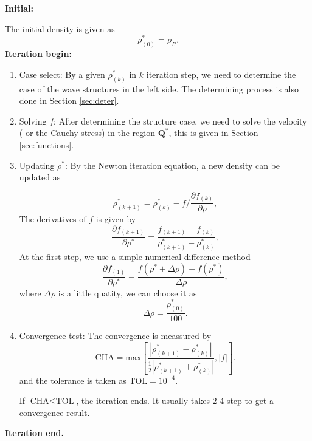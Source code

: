 \documentclass{article}
\numberwithin{equation}{section}
\numberwithin{table}{section}
\begin{document}
\noindent  \textbf{Initial:}

	The initial density is  given as
\begin{equation}
\rho_{(0)}^* = \rho_R.
\end{equation}
\textbf{Iteration begin:}
\begin{enumerate}[Step 1]
  \item Case select:
	By a given  $\rho _{(k)}^*$ in $k$ iteration step, we need to determine the case of the wave structures in the left side. The determining  process is  also done in Section \ref{sec:deter}.

  \item Solving $f$:  After determining the structure case, we need to solve the velocity ( or  the Cauchy stress) in  the region $\mathbf{Q}^*$, this is  given in Section \ref{sec:functions}.

  \item  Updating   $\rho^*$:   By the Newton iteration equation, a new density can be updated as

\begin{equation}
 \rho^*_{(k+1)} = \rho^*_{(k)}- f/\frac{\partial f_{(k)}}{\partial \rho},
\end{equation}
The derivatives of $f$ is  given by
\begin{equation}
  \frac{\partial f_{(k+1)}}{\partial \rho^*} = \frac{f_{(k+1)}-f_{(k)}}{\rho_{(k+1)}^* - \rho^*_{(k)}},
\end{equation}
At the first step, we use a simple  numerical difference  method
\begin{equation}
  \frac{\partial f_{(1)}}{\partial \rho^*} = \frac{f(\rho^*+\Delta \rho)-f(\rho^*)}{\Delta \rho},
\end{equation}
where $\Delta \rho$ is a little quatity, we can choose it as
\begin{equation}
  \Delta \rho = \frac{\rho_{(0)}^*}{100}.
\end{equation}
\item Convergence test:
The  convergence is meassured by
\begin{equation}
\text{CHA} = \text{max} \left[
\frac{|\rho_{(k+1)}^*- \rho_{(k)}^*|}{\frac{1}{2}|\rho_{(k+1)}^*+\rho_{(k)}^*|},|f|\right].
\end{equation}
and the tolerance is taken as $\text{TOL} = 10^{-4}$.

If $ \text{CHA} \le \text{TOL} $, the iteration ends.
It usually takes 2-4 step to get a convergence result.
\end{enumerate}
\textbf{Iteration end.}
\end{document}
